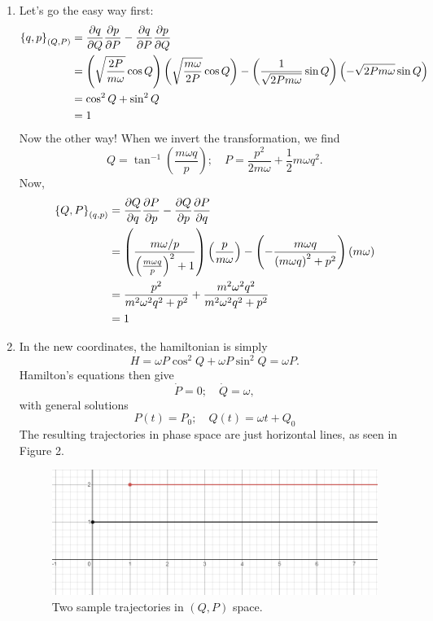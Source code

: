 \documentclass[12pt]{article}
\begin{document}
\begin{enumerate}[label=\roman*.]
    \item Let's go the easy way first:
    \begin{align*}
        \poissonbracket{q}{p}_{(Q,P)} &= \pdv{q}{Q}\pdv{p}{P} - \pdv{q}{P}\pdv{p}{Q} \\
        &= \left(\sqrt{\frac{2P}{m\omega}}\cos Q\right)\left(\sqrt{\frac{m\omega}{2P}}\cos Q\right) - \left(\frac{1}{\sqrt{2Pm\omega}}\sin Q\right)\left(-\sqrt{2Pm\omega}\sin Q\right) \\
        &= \cos^2 Q + \sin^2 Q \\
        &= 1
    \end{align*}
    Now the other way! When we invert the transformation, we find
    \[ Q = \tan^{-1}(\frac{m\omega q}{p}); \quad P = \frac{p^2}{2m\omega} + \frac{1}{2}m\omega q^2. \]
    Now,
    \begin{align*}
        \poissonbracket{Q}{P}_{(q,p)} &= \pdv{Q}{q}\pdv{P}{p} - \pdv{Q}{p}\pdv{P}{q} \\
        &= \left(\frac{m\omega/p}{\left(\frac{m\omega q}{p}\right)^2 + 1}\right)\left(\frac{p}{m\omega}\right) - \left(-\frac{m\omega q}{\left(m \omega q\right)^2 + p^2}\right)\left(m\omega\right) \\
        &= \frac{p^2}{m^2\omega^2q^2 + p^2} + \frac{m^2\omega^2q^2}{m^2\omega^2q^2 + p^2} \\
        &= 1
    \end{align*}

    \item In the new coordinates, the hamiltonian is simply
    \[ H = \omega P\cos^2 Q + \omega P\sin^2 Q = \omega P. \]
    Hamilton's equations then give
    \[ \dot{P} = 0; \quad \dot{Q} = \omega, \]
    with general solutions
    \[ P(t) = P_0; \quad Q(t) = \omega t + Q_0 \]
    The resulting trajectories in phase space are just horizontal lines, as seen in Figure 2.
    \begin{figure}[H]
        \includegraphics[scale=0.6]{fig2}
        \centering
        \caption{Two sample trajectories in $(Q,P)$ space.}
        \label{fig2}
    \end{figure}
\end{enumerate}
\end{document}
